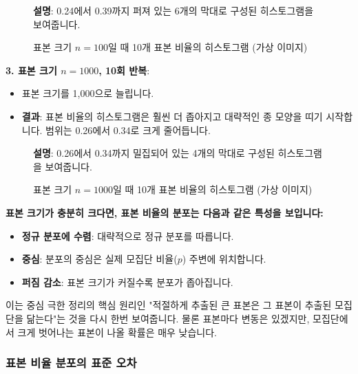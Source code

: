 \documentclass[11pt,a4paper]{book}
\theoremstyle{definition}
\begin{document}
\begin{examplebox}[title={예시: 온라인 광고 구매율 시뮬레이션}]
\begin{figure}[h!]
    \centering
    \caption{표본 크기 $n=100$일 때 10개 표본 비율의 히스토그램 (가상 이미지)}
    \label{fig:hist_prop_n100}
    \textbf{설명}: 0.24에서 0.39까지 퍼져 있는 6개의 막대로 구성된 히스토그램을 보여줍니다.
\end{figure}

\textbf{3. 표본 크기 $n=1000$, 10회 반복}:
\begin{itemize}
    \item 표본 크기를 1,000으로 늘립니다.
    \item \textbf{결과}: 표본 비율의 히스토그램은 훨씬 더 좁아지고 대략적인 종 모양을 띠기 시작합니다. 범위는 0.26에서 0.34로 크게 줄어듭니다.
\end{itemize}

\begin{figure}[h!]
    \centering
    \caption{표본 크기 $n=1000$일 때 10개 표본 비율의 히스토그램 (가상 이미지)}
    \label{fig:hist_prop_n1000}
    \textbf{설명}: 0.26에서 0.34까지 밀집되어 있는 4개의 막대로 구성된 히스토그램을 보여줍니다.
\end{figure}
\end{examplebox}

\begin{summarybox}[title={표본 비율에 대한 CLT의 결론}]
\textbf{표본 크기가 충분히 크다면, 표본 비율의 분포는 다음과 같은 특성을 보입니다:}
\begin{itemize}
    \item \textbf{정규 분포에 수렴}: 대략적으로 정규 분포를 따릅니다.
    \item \textbf{중심}: 분포의 중심은 실제 모집단 비율($p$) 주변에 위치합니다.
    \item \textbf{퍼짐 감소}: 표본 크기가 커질수록 분포가 좁아집니다.
\end{itemize}
이는 중심 극한 정리의 핵심 원리인 "적절하게 추출된 큰 표본은 그 표본이 추출된 모집단을 닮는다"는 것을 다시 한번 보여줍니다. 물론 표본마다 변동은 있겠지만, 모집단에서 크게 벗어나는 표본이 나올 확률은 매우 낮습니다.
\end{summarybox}

\subsubsection*{표본 비율 분포의 표준 오차}
\end{document}
